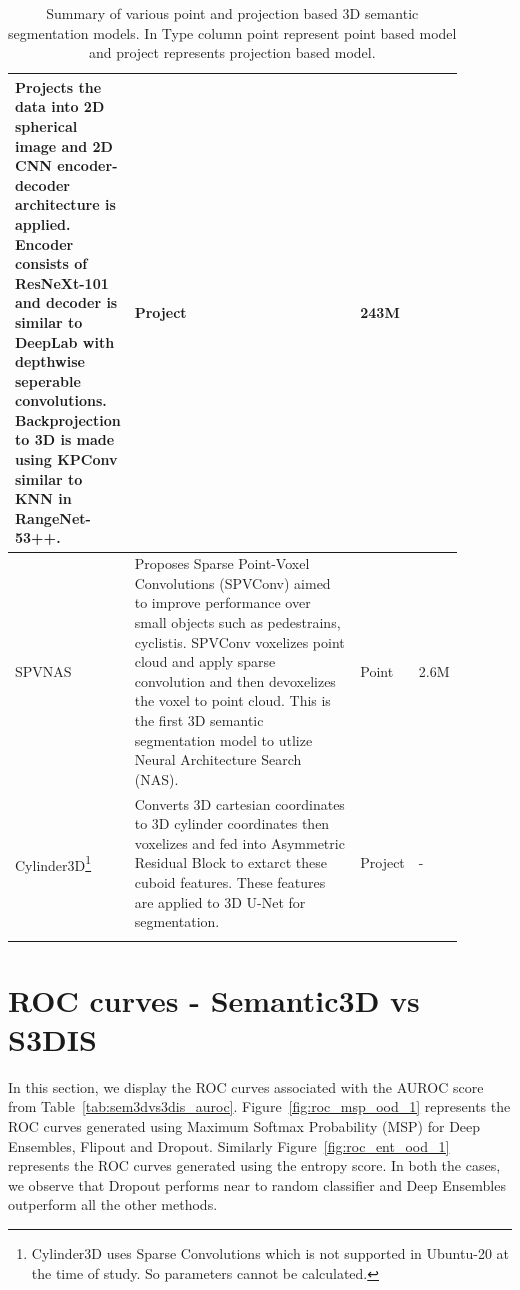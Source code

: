 \begin{longtable}{|p{0.15\linewidth} | p{0.59\linewidth}| p{0.06\linewidth} |p{0.09\linewidth}|}
            Projects the data into 2D spherical image and 2D CNN encoder-decoder architecture is applied.
            Encoder consists of ResNeXt-101 and decoder is similar to DeepLab with depthwise seperable convolutions.
            Backprojection to 3D is made using KPConv similar to KNN in RangeNet-53++.
            & Project & 243M \\
            \hline
            SPVNAS\cite{spvnas} &
            Proposes Sparse Point-Voxel Convolutions (SPVConv) aimed to improve performance over small objects such as pedestrains, cyclistis.
            SPVConv voxelizes point cloud and apply sparse convolution and then devoxelizes the voxel to point cloud.
            This is the first 3D semantic segmentation model to utlize Neural Architecture Search (NAS).
            & Point & 2.6M \\
            \hline
            Cylinder3D\cite{zhu2020cylindrical}\footnote{Cylinder3D uses Sparse Convolutions which is not supported in Ubuntu-20 at the time of study. So parameters cannot be calculated.} &
            Converts 3D cartesian coordinates to 3D cylinder coordinates then voxelizes and fed into Asymmetric Residual Block to extarct these cuboid features.
            These features are applied to 3D U-Net for segmentation.
            & Project & - \\
            \hline
            \caption{Summary of various point and projection based 3D semantic segmentation models. In Type column point represent point based model and project represents projection based model.}
            \label{tab:model_relatedwork}
    \end{longtable}
    
    \section{ROC curves - Semantic3D vs S3DIS}
    \label{sec:app_roc_curves}
    In this section, we display the ROC curves associated with the AUROC score from Table~\ref{tab:sem3dvs3dis_auroc}.
    Figure~\ref{fig:roc_msp_ood_1} represents the ROC curves generated using Maximum Softmax Probability (MSP) for Deep Ensembles, Flipout and Dropout.
    Similarly Figure~\ref{fig:roc_ent_ood_1} represents the ROC curves generated using the entropy score.
    In both the cases, we observe that Dropout performs near to random classifier and Deep Ensembles outperform all the other methods.

